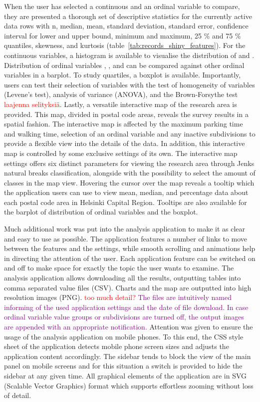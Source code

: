 When the user has selected a continuous and an ordinal variable to compare, they are presented a thorough set of descriptive statistics for the currently active data rows with n, median, mean, standard deviation, standard error, confidence interval for lower and upper bound, minimum and maximum, 25 \% and 75 \% quantiles, skewness, and kurtosis (table~\ref{tab:records_shiny_features}). For the continuous variables, a histogram is available to visualise the distribution of  and . Distribution of ordinal variables , , and  can be compared against other ordinal variables in a barplot. To study quartiles, a boxplot is available. Importantly, users can test their selection of variables with the test of homogeneity of variables (Levene's test), analysis of variance (ANOVA), and the Brown-Forsythe test \textcolor{red}{laajenna selityksiä}. Lastly, a versatile interactive map of the research area is provided. This map, divided in postal code areas, reveals the survey results in a spatial fashion. The interactive map is affected by the maximum parking time and walking time, selection of an ordinal variable and any inactive subdivisions to provide a flexible view into the details of the data. In addition, this interactive map is controlled by some exclusive settings of its own. The interactive map settings offers six distinct parameters for viewing the research area through Jenks natural breaks classification, alongside with the possibility to select the amount of classes in the map view. Hovering the cursor over the map reveals a tooltip which the application users can use to view mean, median, and percentage data about each postal code area in Helsinki Capital Region. Tooltips are also available for the barplot of distribution of ordinal variables and the boxplot.

Much additional work was put into the analysis application to make it as clear and easy to use as possible. The application features a number of links to move between the features and the settings, while smooth scrolling and animations help in directing the attention of the user. Each application feature can be switched on and off to make space for exactly the topic the user wants to examine. The analysis application allows downloading all the results, outputting tables into comma separated value files (CSV). Charts and the map are outputted into high resolution images (PNG). \textcolor{red}{too much detail?} \textcolor{purple}{The files are intuitively named informing of the used application settings and the date of file download. In case ordinal variable value groups or subdivisions are turned off, the output images are appended with an appropriate notification.} Attention was given to ensure the usage of the analysis application on mobile phones. To this end, the CSS style sheet of the application detects mobile phone screen sizes and adjusts the application content accordingly. The sidebar tends to block the view of the main panel on mobile screens and for this situation a switch is provided to hide the sidebar at any given time. All graphical elements of the application are in SVG (Scalable Vector Graphics) format which supports effortless zooming without loss of detail.

